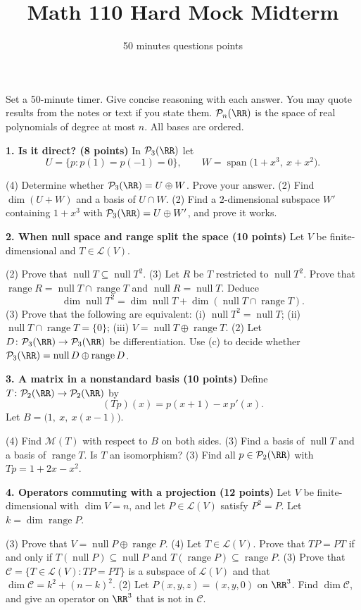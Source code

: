 \documentclass[11pt]{scrartcl}
\title{Math 110 Hard Mock Midterm}
\subtitle{50 minutes \quad 4 questions \quad 40 points}
\author{}
\date{}
\DeclareMathOperator{\nul}{null}
\DeclareMathOperator{\range}{range}
\DeclareMathOperator{\spn}{span}
\newcommand{\LL}{\mathcal L}
\newcommand{\PP}{\mathcal P}
\newcommand{\MM}{\mathcal M}
\begin{document}
\maketitle

\noindent Set a 50-minute timer. Give concise reasoning with each answer. You may quote results from the notes or text if you state them. $\PP_n(\RR)$ is the space of real polynomials of degree at most $n$. All bases are ordered.

\medskip\noindent\textbf{1. Is it direct? (8 points)} In $\PP_3(\RR)$ let
\[ U=\{p:p(1)=p(-1)=0\},\qquad W=\spn\big(1+x^3,\ x+x^2\big). \]
\begin{enumerate}[a)]
  \ii (4) Determine whether $\PP_3(\RR)=U\oplus W$. Prove your answer.
  \ii (2) Find $\dim(U+W)$ and a basis of $U\cap W$.
  \ii (2) Find a $2$-dimensional subspace $W'$ containing $1+x^3$ with $\PP_3(\RR)=U\oplus W'$, and prove it works.
\end{enumerate}

\medskip\noindent\textbf{2. When null space and range split the space (10 points)} Let $V$ be finite-dimensional and $T\in\LL(V)$.
\begin{enumerate}[a)]
  \ii (2) Prove that $\nul T\subseteq\nul T^2$.
  \ii (3) Let $R$ be $T$ restricted to $\nul T^2$. Prove that $\range R=\nul T\cap\range T$ and $\nul R=\nul T$. Deduce
  \[ \dim\nul T^2=\dim\nul T+\dim(\nul T\cap\range T). \]
  \ii (3) Prove that the following are equivalent: (i) $\nul T^2=\nul T$; (ii) $\nul T\cap\range T=\{0\}$; (iii) $V=\nul T\oplus\range T$.
  \ii (2) Let $D\colon\PP_3(\RR)\to\PP_3(\RR)$ be differentiation. Use (c) to decide whether $\PP_3(\RR)=\nul D\oplus\range D$.
\end{enumerate}

\medskip\noindent\textbf{3. A matrix in a nonstandard basis (10 points)} Define $T\colon\PP_2(\RR)\to\PP_2(\RR)$ by
\[ (Tp)(x)=p(x+1)-x\,p'(x). \]
Let $B=\big(1,\ x,\ x(x-1)\big)$.
\begin{enumerate}[a)]
  \ii (4) Find $\MM(T)$ with respect to $B$ on both sides.
  \ii (3) Find a basis of $\nul T$ and a basis of $\range T$. Is $T$ an isomorphism?
  \ii (3) Find all $p\in\PP_2(\RR)$ with $Tp=1+2x-x^2$.
\end{enumerate}

\medskip\noindent\textbf{4. Operators commuting with a projection (12 points)} Let $V$ be finite-dimensional with $\dim V=n$, and let $P\in\LL(V)$ satisfy $P^2=P$. Let $k=\dim\range P$.
\begin{enumerate}[a)]
  \ii (3) Prove that $V=\nul P\oplus\range P$.
  \ii (4) Let $T\in\LL(V)$. Prove that $TP=PT$ if and only if $T(\nul P)\subseteq\nul P$ and $T(\range P)\subseteq\range P$.
  \ii (3) Prove that $\mathcal C=\{T\in\LL(V):TP=PT\}$ is a subspace of $\LL(V)$ and that $\dim\mathcal C=k^2+(n-k)^2$.
  \ii (2) Let $P(x,y,z)=(x,y,0)$ on $\RR^3$. Find $\dim\mathcal C$, and give an operator on $\RR^3$ that is not in $\mathcal C$.
\end{enumerate}
\end{document}
